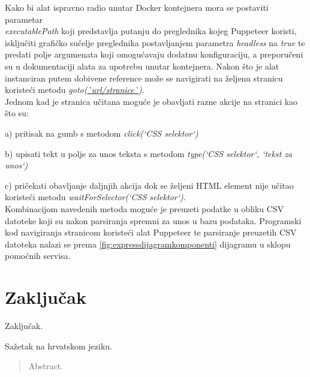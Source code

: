 \documentclass[times, utf8, zavrsni]{fer}
\begin{document}
Kako bi alat ispravno radio unutar Docker kontejnera mora se postaviti parametar \\\emph{executablePath} koji predstavlja putanju 
do preglednika kojeg Puppeteer koristi, isključiti grafičko sučelje preglednika postavljanjem parametra \emph{headless} na \emph{true} te predati 
polje argumenata koji omogućavaju dodatnu konfiguraciju, a preporučeni su u dokumentaciji alata za upotrebu unutar kontejnera.
Nakon što je alat instanciran putem dobivene reference može se navigirati na željenu stranicu koristeći metodu \emph{goto(\url{`url/stranice`})}.
\\Jednom kad je stranica učitana moguće je obavljati razne akcije na stranici kao što su:

    a) pritisak na gumb s metodom \emph{click(`CSS selektor`)}

    b) upisati tekt u polje za unos teksta s metodom \emph{type(`CSS selektor`, `tekst za unos`)}

    c) pričekati obavljanje daljnjih akcija dok se željeni HTML element nije učitao koristeći metodu \emph{waitForSelector(`CSS selektor`)}.
\\Kombinacijom navedenih metoda moguće je preuzeti podatke u obliku CSV datoteke koji su nakon parsiranja spremni za unos u bazu podataka.
Programski kod navigiranja stranicom koristeći alat Puppeteer te parsiranje preuzetih CSV datoteka nalazi se prema \ref{fig:expressdijagramkomponenti}
dijagramu u sklopu pomoćnih servisa.

\chapter{Zaključak}
Zaključak.




\begin{sazetak}
Sažetak na hrvatskom jeziku.

\end{sazetak}

\begin{abstract}
Abstract.

\end{abstract}
\end{document}
